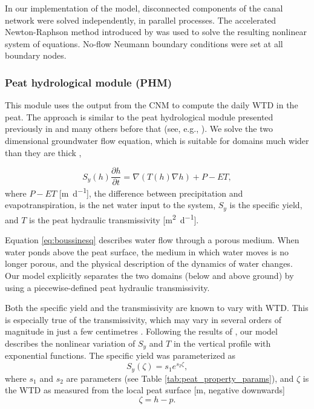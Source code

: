\documentclass[bg, manuscript]{copernicus}
\begin{document}
In our implementation of the model, disconnected components of the canal network were solved independently, in parallel processes.
The accelerated Newton-Raphson method introduced by \cite{liuApplyingMicroprocessorAnalysis2014} was used to solve the resulting nonlinear system of equations.
No-flow Neumann boundary conditions were set at all boundary nodes.

\subsubsection{Peat hydrological module (PHM)}
This module uses the output from the CNM to compute the daily WTD in the peat.
The approach is  similar  to the peat hydrological module presented previously in \cite{urzainkiCanalBlockingOptimization2020} and many others before that (see, e.g., \cite{cobbHowTemporalPatterns2017, morrisDigiBogPeatlandDevelopment2012, putraModellingPerformanceBunds2022}).
We solve the two dimensional groundwater flow equation, which is suitable for domains much wider than they are thick \citep{connortonDoesRegionalGroundwaterflow1985, bearModelingGroundwaterFlow2010},

\begin{equation} \label{eq:boussinesq}
S_y(h)\frac{\partial h}{\partial t} = \nabla\left(T(h) \nabla h \right) + P - ET,
\end{equation}
where $P - ET$ [\unit{m d^{-1}}], the difference between precipitation and evapotranspiration, is the net water input to the system, $S_y$ is the specific yield, and $T$ is the peat hydraulic transmissivity [\unit{m^2d^{-1}}].

Equation \eqref{eq:boussinesq} describes water flow through a porous medium.
When water ponds above the peat surface, the medium in which water moves is no longer porous, and the physical description of the dynamics of water changes.
Our model explicitly separates the two domains (below and above ground) by using a piecewise-defined peat hydraulic transmissivity.

Both the specific yield and the transmissivity are known to vary with WTD.
This is especially true of the transmissivity, which may vary in several orders of magnitude in just a few centimetres \citep{cobbHowTemporalPatterns2017}.
Following the results of \cite{cobbScalarSimulationParameterization2019}, our model describes the nonlinear variation of $S_y$ and  $T$ in the vertical profile with exponential functions.
The specific yield was parameterized as
\begin{equation} \label{eq:S_zeta}
S_y (\zeta) = s_1 e^{s_2\zeta},
\end{equation}
where $s_1$ and $s_2$ are parameters (see Table \ref{tab:peat_property_params}), and $\zeta$ is the WTD as measured from the local peat surface [\unit{m}, negative downwards]
\begin{equation} \label{eq:def_zeta}
\zeta = h - p.
\end{equation}
\end{document}
